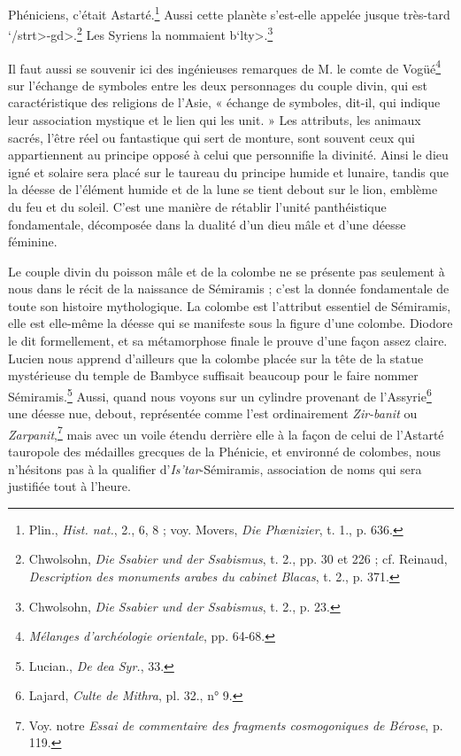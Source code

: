 \documentclass[a4paper, 11pt, oneside]{article}
\begin{document}
Phéniciens, c'était Astarté.\footnote{Plin., \emph{Hist. nat.}, 2., 6, 8 ; voy. Movers, \emph{Die Phœnizier}, t. 1., p. 636.} Aussi cette planète s'est-elle appelée jusque très-tard \<`/strt>-\<gd>.\footnote{Chwolsohn, \emph{Die Ssabier und der Ssabismus}, t. 2., pp. 30 et 226 ; cf. Reinaud, \emph{Description des monuments arabes du cabinet Blacas}, t. 2., p. 371.} Les Syriens la nommaient \<b`lty>.\footnote{Chwolsohn, \emph{Die Ssabier und der Ssabismus}, t. 2., p. 23.}

Il faut aussi se souvenir ici des ingénieuses remarques de M. le comte de Vogüé\footnote{\emph{Mélanges d'archéologie orientale}, pp. 64-68.} sur l'échange de symboles entre les deux personnages du couple divin, qui est caractéristique des religions de l'Asie, « échange de symboles, dit-il, qui indique leur association mystique et le lien qui les unit. » Les attributs, les animaux sacrés, l'être réel ou fantastique qui sert de monture, sont souvent ceux qui appartiennent au principe opposé à celui que personnifie la divinité. Ainsi le dieu igné et solaire sera placé sur le taureau du principe humide et lunaire, tandis que la déesse de l'élément humide et de la lune se tient debout sur le lion, emblème du feu et du soleil. C'est une manière de rétablir l'unité panthéistique fondamentale, décomposée dans la dualité d'un dieu mâle et d'une déesse féminine.

Le couple divin du poisson mâle et de la colombe ne se présente pas seulement à nous dans le récit de la naissance de Sémiramis ; c'est la donnée fondamentale de toute son histoire mythologique. La colombe est l'attribut essentiel de Sémiramis, elle est elle-même la déesse qui se manifeste sous la figure d'une colombe. Diodore le dit formellement, et sa métamorphose finale le prouve d'une façon assez claire. Lucien nous apprend d'ailleurs que la colombe placée sur la tête de la statue mystérieuse du temple de Bambyce suffisait beaucoup pour le faire nommer Sémiramis.\footnote{Lucian., \emph{De dea Syr.}, 33.} Aussi, quand nous voyons sur un cylindre provenant de l'Assyrie\footnote{Lajard, \emph{Culte de Mithra}, pl. 32., n° 9.} une déesse nue, debout, représentée comme l'est ordinairement \emph{Zir-banit} ou \emph{Zarpanit},\footnote{Voy. notre \emph{Essai de commentaire des fragments cosmogoniques de Bérose}, p. 119.} mais avec un voile étendu derrière elle à la façon de celui de l'Astarté tauropole des médailles grecques de la Phénicie, et environné de colombes, nous n'hésitons pas à la qualifier d'\emph{Is'tar}-Sémiramis, association de noms qui sera justifiée tout à l'heure.
\end{document}
